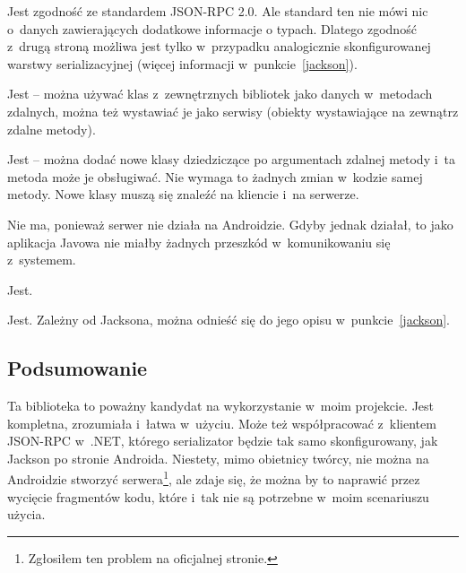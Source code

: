 \begin{description}

Jest zgodność ze standardem JSON-RPC 2.0. Ale standard ten nie mówi nic o~danych zawierających dodatkowe informacje o typach.
Dlatego zgodność z~drugą stroną możliwa jest tylko w~przypadku analogicznie skonfigurowanej warstwy serializacyjnej (więcej informacji w~punkcie~\ref{jackson}).

Jest -- można używać klas z~zewnętrznych bibliotek jako danych w~metodach zdalnych, można też wystawiać je jako serwisy (obiekty wystawiające na zewnątrz zdalne metody).

Jest -- można dodać nowe klasy dziedziczące po argumentach zdalnej metody i~ta metoda może je obsługiwać. Nie wymaga to żadnych zmian w~kodzie samej metody. Nowe klasy muszą się znaleźć na kliencie i~na serwerze.

Nie ma, ponieważ serwer nie działa na Androidzie. Gdyby jednak działał, to jako aplikacja Javowa nie miałby żadnych przeszkód w~komunikowaniu się z~systemem.

Jest.

Jest. Zależny od Jacksona, można odnieść się do jego opisu w~punkcie~\ref{jackson}.
\end{description}

\subsection{Podsumowanie}
Ta biblioteka to poważny kandydat na wykorzystanie w~moim projekcie.
Jest kompletna, zrozumiała i~łatwa w~użyciu.
Może też współpracować z~klientem JSON-RPC w~.NET, którego serializator będzie tak samo skonfigurowany, jak Jackson po stronie Androida.
Niestety, mimo obietnicy twórcy, nie można na Androidzie stworzyć serwera\footnote{Zgłosiłem ten problem na oficjalnej stronie.}, ale zdaje się, że można by to naprawić przez wycięcie fragmentów kodu, które i~tak nie są potrzebne w~moim scenariuszu użycia.


